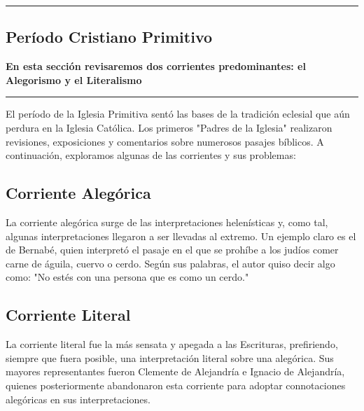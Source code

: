 {\color{gray}\hrule}
\begin{center}
\section{Período Cristiano Primitivo}
\textbf{En esta sección revisaremos dos corrientes predominantes: el Alegorismo y el Literalismo}
\end{center}
{\color{gray}\hrule}
\begin{multicols}{2}

El período de la Iglesia Primitiva sentó las bases de la tradición eclesial que aún perdura en la Iglesia Católica. Los primeros "Padres de la Iglesia" realizaron revisiones, exposiciones y comentarios sobre numerosos pasajes bíblicos. A continuación, exploramos algunas de las corrientes y sus problemas:

\subsection{Corriente Alegórica}

La corriente alegórica surge de las interpretaciones helenísticas y, como tal, algunas interpretaciones llegaron a ser llevadas al extremo. Un ejemplo claro es el de Bernabé, quien interpretó el pasaje en el que se prohíbe a los judíos comer carne de águila, cuervo o cerdo. Según sus palabras, el autor quiso decir algo como: "No estés con una persona que es como un cerdo."

\subsection{Corriente Literal}

La corriente literal fue la más sensata y apegada a las Escrituras, prefiriendo, siempre que fuera posible, una interpretación literal sobre una alegórica. Sus mayores representantes fueron Clemente de Alejandría e Ignacio de Alejandría, quienes posteriormente abandonaron esta corriente para adoptar connotaciones alegóricas en sus interpretaciones.

\end{multicols}
